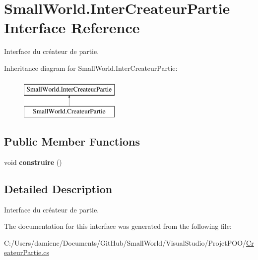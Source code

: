 \hypertarget{interface_small_world_1_1_inter_createur_partie}{\section{Small\-World.\-Inter\-Createur\-Partie Interface Reference}
\label{interface_small_world_1_1_inter_createur_partie}
}


Interface du créateur de partie.  


Inheritance diagram for Small\-World.\-Inter\-Createur\-Partie\-:\begin{figure}[H]
\begin{center}
\leavevmode
\includegraphics[height=2.000000cm]{interface_small_world_1_1_inter_createur_partie}
\end{center}
\end{figure}
\subsection*{Public Member Functions}
\begin{DoxyCompactItemize}
\item 
\hypertarget{interface_small_world_1_1_inter_createur_partie_aa8e8cbb8dac4adabbbdd8384571573ab}{void {\bfseries construire} ()}\label{interface_small_world_1_1_inter_createur_partie_aa8e8cbb8dac4adabbbdd8384571573ab}

\end{DoxyCompactItemize}


\subsection{Detailed Description}
Interface du créateur de partie. 

The documentation for this interface was generated from the following file\-:\begin{DoxyCompactItemize}
\item 
C\-:/\-Users/damienc/\-Documents/\-Git\-Hub/\-Small\-World/\-Visual\-Studio/\-Projet\-P\-O\-O/\hyperlink{_createur_partie_8cs}{Createur\-Partie.\-cs}\end{DoxyCompactItemize}
